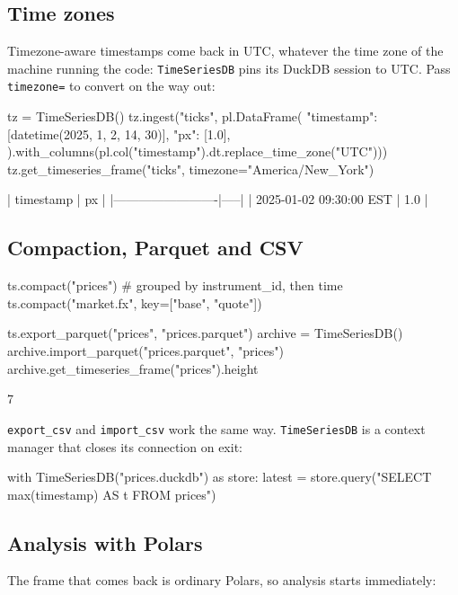 \documentclass[11pt,a4paper]{article}
\newcommand{\code}[1]{\texttt{#1}}
\begin{document}
\subsection{Time zones}

Timezone-aware timestamps come back in UTC, whatever the time zone of the machine
running the code: \code{TimeSeriesDB} pins its DuckDB session to UTC. Pass
\code{timezone=} to convert on the way out:

\begin{python}
tz = TimeSeriesDB()
tz.ingest("ticks", pl.DataFrame({
    "timestamp": [datetime(2025, 1, 2, 14, 30)], "px": [1.0],
}).with_columns(pl.col("timestamp").dt.replace_time_zone("UTC")))
tz.get_timeseries_frame("ticks", timezone="America/New_York")
\end{python}
\begin{console}
| timestamp               | px  |
|-------------------------|-----|
| 2025-01-02 09:30:00 EST | 1.0 |
\end{console}

\subsection{Compaction, Parquet and CSV}

\begin{python}
ts.compact("prices")                           # grouped by instrument_id, then time
ts.compact("market.fx", key=["base", "quote"])

ts.export_parquet("prices", "prices.parquet")
archive = TimeSeriesDB()
archive.import_parquet("prices.parquet", "prices")
archive.get_timeseries_frame("prices").height
\end{python}
\begin{console}
7
\end{console}

\code{export\_csv} and \code{import\_csv} work the same way. \code{TimeSeriesDB} is a
context manager that closes its connection on exit:

\begin{python}
with TimeSeriesDB("prices.duckdb") as store:
    latest = store.query("SELECT max(timestamp) AS t FROM prices")
\end{python}

\subsection{Analysis with Polars}

The frame that comes back is ordinary Polars, so analysis starts immediately:
\end{document}
